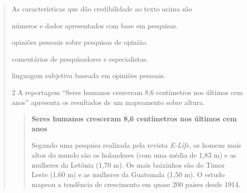 \begin{escolha}
\begin{escolha}
\begin{quote}

As características que dão credibilidade ao texto acima são

\begin{escolha}
\item números e dados apresentados com base em pesquisas.

\item opiniões pessoais sobre pesquisas de opinião.

\item comentários de pesquisadores e especialistas.

\item linguagem subjetiva baseada em opiniões pessoais.
\end{escolha}


\num{2} A reportagem ``Seres humanos cresceram 8,6 centímetros nos últimos cem
anos'' apresenta os resultados de um mapeamento sobre altura.

\begin{quote}
\textbf{Seres humanos cresceram 8,6 centímetros nos últimos cem anos}

Segundo uma pesquisa realizada pela revista \textit{E-Life}, os homens
mais altos do mundo são os holandeses (com uma média de 1,83 m) e as
mulheres da Letônia (1,70 m). Os mais baixinhos são do Timor Leste (1,60 m)
e as mulheres da Guatemala (1,50 m). O estudo mapeou a tendência de
crescimento em quase 200 países desde 1914.


\end{quote}
\end{quote}
\end{escolha}
\end{escolha}
